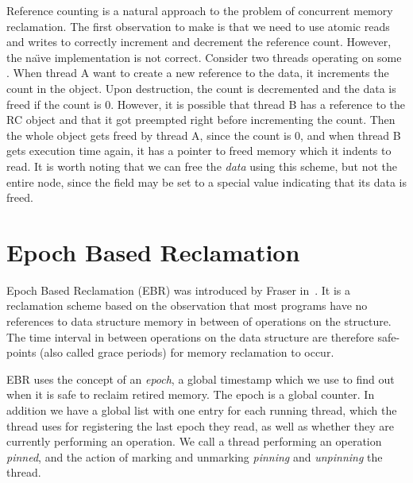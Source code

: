 \documentclass[a4paper,twoside]{report}
\begin{document}
 Reference counting
is a natural approach to the problem of concurrent memory reclamation.  The
first observation to make is that we need to use atomic reads and writes to
correctly increment and decrement the reference count. However, the na\"\i{}ve
implementation is not correct.  Consider two threads operating on some
.  When thread A want to create a new reference to the data, it
increments the count in the  object. Upon destruction, the count is
decremented and the data is freed if the count is 0.  However, it is possible
that thread B has a reference to the RC object and that it got preempted right
before incrementing the count.  Then the whole object gets freed by thread A,
since the count is 0, and when thread B gets execution time again, it has a
pointer to freed memory which it indents to read.  It is worth noting that we
can free the \emph{data} using this scheme, but not the entire  node,
since the  field may be set to a special value indicating that its
data is freed.



%

\section{Epoch Based Reclamation}
Epoch Based Reclamation (EBR) was introduced by Fraser
in~\cite{fraser2004practical}.  It is a reclamation scheme based on the
observation that most programs have no references to data structure memory in
between of operations on the structure.  The time interval in between
operations on the data structure are therefore safe-points (also called grace
periods) for memory reclamation to occur.  

EBR uses the concept of an \emph{epoch}, a global timestamp which we use to
find out when it is safe to reclaim retired memory.  The epoch is a global
counter.  In addition we have a global list with one entry for each running
thread, which the thread uses for registering the last epoch they read, as well
as whether they are currently performing an operation.  We call a thread
performing an operation \emph{pinned}, and the action of marking and unmarking
\emph{pinning} and \emph{unpinning} the thread.
\end{document}
